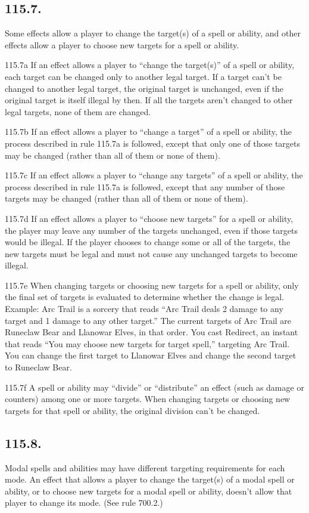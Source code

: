 \subsection*{115.7.}
Some effects allow a player to change the target(s) of a spell or ability, and other effects allow a player to choose new targets for a spell or ability.

115.7a If an effect allows a player to “change the target(s)” of a spell or ability, each target can be changed only to another legal target. If a target can’t be changed to another legal target, the original target is unchanged, even if the original target is itself illegal by then. If all the targets aren’t changed to other legal targets, none of them are changed.

115.7b If an effect allows a player to “change a target” of a spell or ability, the process described in rule 115.7a is followed, except that only one of those targets may be changed (rather than all of them or none of them).

115.7c If an effect allows a player to “change any targets” of a spell or ability, the process described in rule 115.7a is followed, except that any number of those targets may be changed (rather than all of them or none of them).

115.7d If an effect allows a player to “choose new targets” for a spell or ability, the player may leave any number of the targets unchanged, even if those targets would be illegal. If the player chooses to change some or all of the targets, the new targets must be legal and must not cause any unchanged targets to become illegal.

115.7e When changing targets or choosing new targets for a spell or ability, only the final set of targets is evaluated to determine whether the change is legal.
Example: Arc Trail is a sorcery that reads “Arc Trail deals 2 damage to any target and 1 damage to any other target.” The current targets of Arc Trail are Runeclaw Bear and Llanowar Elves, in that order. You cast Redirect, an instant that reads “You may choose new targets for target spell,” targeting Arc Trail. You can change the first target to Llanowar Elves and change the second target to Runeclaw Bear.

115.7f A spell or ability may “divide” or “distribute” an effect (such as damage or counters) among one or more targets. When changing targets or choosing new targets for that spell or ability, the original division can’t be changed.

\subsection*{115.8.}
Modal spells and abilities may have different targeting requirements for each mode. An effect that allows a player to change the target(s) of a modal spell or ability, or to choose new targets for a modal spell or ability, doesn’t allow that player to change its mode. (See rule 700.2.)

